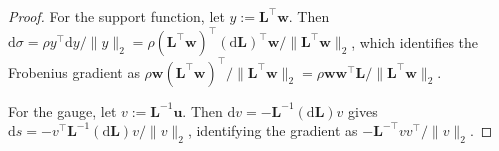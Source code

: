 \documentclass[10pt,a4paper]{amsart}
\newcommand{\bL}{\bm{L}}
\newcommand{\bu}{\bm{u}}
\newcommand{\bw}{\bm{w}}
\begin{document}
\begin{proof}
For the support function, let $y:=\bL^\top\bw$. Then $\mathrm{d}\sigma = \rho y^\top\mathrm{d}y/\|y\|_2 = \rho(\bL^\top\bw)^\top(\mathrm{d}\bL)^\top\bw/\|\bL^\top\bw\|_2$, which identifies the Frobenius gradient as $\rho\bw(\bL^\top\bw)^\top/\|\bL^\top\bw\|_2 = \rho\bw\bw^\top\bL/\|\bL^\top\bw\|_2$.

For the gauge, let $v:=\bL^{-1}\bu$. Then $\mathrm{d}v=-\bL^{-1}(\mathrm{d}\bL)v$ gives $\mathrm{d}s = -v^\top\bL^{-1}(\mathrm{d}\bL)v/\|v\|_2$, identifying the gradient as $-\bL^{-\top}vv^\top/\|v\|_2$.
\end{proof}
\end{document}
